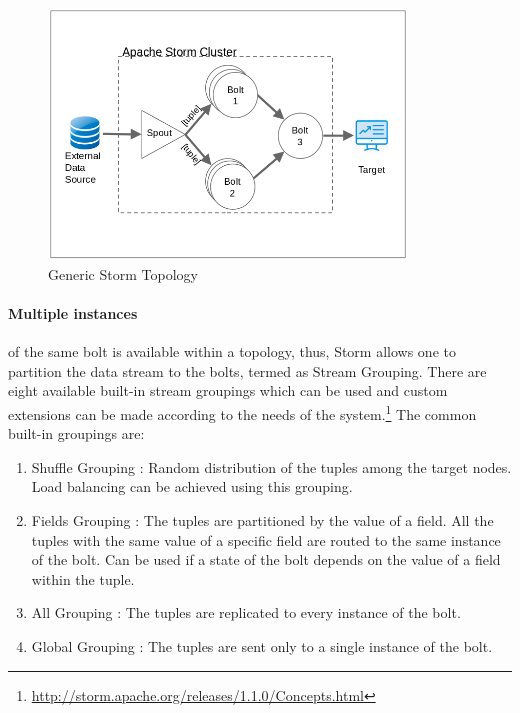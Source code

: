 \documentclass[runningheads,a4paper]{llncs}[2015/06/24]
\begin{document}
\begin{figure}
  \begin{center}
    \includegraphics[width=0.85\textwidth]{topo.png}
    \caption{Generic Storm Topology}
    \label{fig:topo}
   \end{center}
\end{figure}

\paragraph{Multiple instances} of the same bolt is available within a topology, thus, Storm allows one to partition the data stream to the bolts, termed as Stream Grouping. There are eight available built-in stream groupings which can be used and custom extensions can be made according to the needs of the system.\footnote{\url{http://storm.apache.org/releases/1.1.0/Concepts.html}} The common built-in groupings are:

\begin{enumerate}
\item{Shuffle Grouping} : Random distribution of the tuples among the target nodes. Load balancing can be achieved using this grouping.
\item{Fields Grouping} : The tuples are partitioned by the value of a field. All the tuples with the same value of a specific field are routed to the same instance of the bolt. Can be used if a state of the bolt depends on the value of a field within the tuple.
\item{All Grouping} : The tuples are replicated to every instance of the bolt.
\item{Global Grouping} : The tuples are sent only to a single instance of the bolt.
\end{enumerate}
\end{document}
